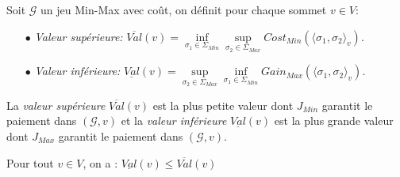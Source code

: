 
\begin{defi}
	
	Soit $\mathcal{G}$ un jeu Min-Max avec coût, on définit pour chaque sommet $v \in V$: 
	\begin{enumerate}
		\item[$\bullet$]\textit{Valeur supérieure:} $\overline{Val}(v) = \inf\limits_{\sigma _{1} \in \Sigma _{Min}} \sup\limits_{\sigma _{2} \in \Sigma_{Max}} Cost_{Min}(\langle \sigma _{1},\sigma _{2}\rangle_v)$.		
		\item[$\bullet$]\textit{Valeur inférieure:} $\underline{Val}(v) = \sup\limits_{\sigma _{2} \in \Sigma_{Max}}  \inf\limits_{\sigma _{1} \in \Sigma _{Min}} Gain_{Max}(\langle \sigma _{1},\sigma _{2}\rangle_v)$.
	\end{enumerate}
\end{defi}
\begin{rem}
	La \textit{valeur supérieure}  $\overline{Val}(v)$ est la plus petite valeur dont $J_{Min}$ garantit le paiement dans $(\mathcal{G},v)$ et la \textit{valeur inférieure} $\underline{Val}(v) $ est la plus grande valeur dont $J_{Max}$ garantit le paiement dans $(\mathcal{G},v)$.
\end{rem}

\begin{propriete}
	Pour tout $v \in V$, on a : $\underline{Val}(v) \leq \overline{Val}(v)$
\end{propriete}
\setlength{\overfullrule}{0pt}

